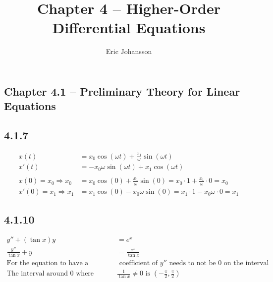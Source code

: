\documentclass{article}
\title{Chapter 4 -- Higher-Order Differential Equations}
\author{Eric Johansson}
\begin{document}
\maketitle
\tableofcontents
\newpage

\subsection{Chapter 4.1 -- Preliminary Theory for Linear Equations }


\subsection{4.1.7}
\begin{align*}
    x(t) &= x_0\cos (\omega t)+\frac{x_1}{\omega}\sin (\omega t)\\
    x'(t) &= -x_0 \omega\sin(\omega t)+x_1\cos  (\omega t)\\\\
    x(0)  = x_0 \Rightarrow   x_0   &= x_0\cos (0)+\frac{x_1}{\omega}\sin (0) = x_0\cdot 1+\frac{x_1}{\omega}\cdot 0 = x_0\\
    x'(0)  = x_1 \Rightarrow x_1 &= x_1\cos (0)-x_0\omega\sin (0) = x_1 \cdot 1 - x_0\omega\cdot 0   = x_1
\end{align*}

\subsection{4.1.10}
\begin{align*}
    y''+(\tan x)y &= e^{x}\\
    \frac{y''}{\tan x}+y &= \frac{e^{x}}{\tan x} \\
    \text{For the equation to have a solution the}& \text{ coefficient of \(y''\) needs to not be 0 on the interval}\\
    \text{The interval around 0 where } &\frac{1}{\tan x}\neq 0\text{ is } \left(-\frac{\pi}{2},\frac{\pi}{2}\right)
\end{align*}
\end{document}
